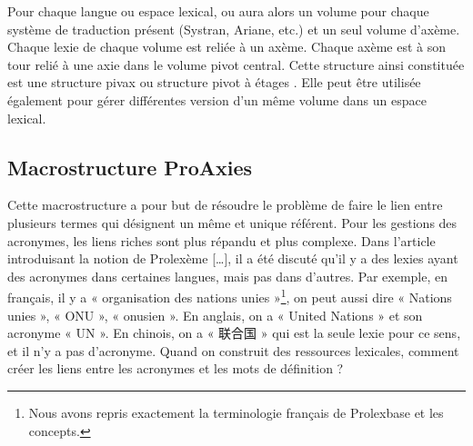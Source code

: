 \documentclass[10pt,a4paper,twoside]{article}
\newcommand{\Chinois}[1]{{\fontspec[Scale=0.9]{STSong}#1}}
\begin{document}
Pour chaque langue ou espace lexical, ou aura alors un volume pour chaque système de traduction présent (Systran, Ariane, etc.) et un seul volume d'axème. Chaque lexie de chaque volume est reliée à un axème. Chaque axème est à son tour relié à une axie dans le volume pivot central.
Cette structure ainsi constituée est une structure pivax ou structure pivot à étages \cite{MMHTN09}. Elle peut être utilisée également pour gérer différentes version d'un même volume dans un espace lexical.

\subsection{Macrostructure ProAxies}

Cette macrostructure a pour but de résoudre le problème de faire le lien entre plusieurs termes qui désignent un même et unique référent. Pour les gestions des acronymes, les liens riches sont plus répandu et plus complexe. Dans l'article introduisant la notion de Prolexème […], il a été discuté qu’il y a des lexies ayant des acronymes dans certaines langues, mais pas dans d'autres. Par exemple, en français, il y a « organisation des nations unies »\footnote{Nous avons repris exactement la terminologie français de Prolexbase et les concepts.}, on peut aussi dire « Nations unies », « ONU », « onusien ». En anglais, on a « United Nations » et son acronyme « UN ». En chinois, on a «\Chinois{ 联合国 }» qui est la seule lexie pour ce sens, et il n’y a pas d’acronyme. Quand on construit des ressources lexicales, comment créer les liens entre les acronymes et les mots de définition ? \\
\end{document}

